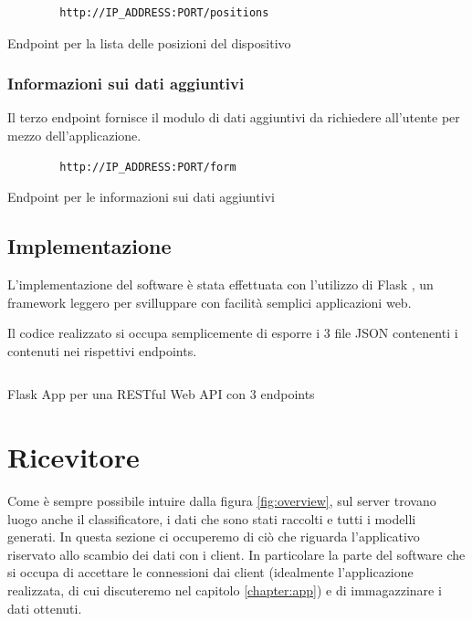 \begin{listing}[H] 
    \begin{verbatim}
        http://IP_ADDRESS:PORT/positions
    \end{verbatim}
    \caption{Endpoint per la lista delle posizioni del dispositivo}
    \label{listing:endpoint-positions}
\end{listing}

\subsubsection{Informazioni sui dati aggiuntivi}
Il terzo endpoint fornisce il modulo di dati aggiuntivi da richiedere all'utente per mezzo dell'applicazione.

\begin{listing}[H] 
    \begin{verbatim}
        http://IP_ADDRESS:PORT/form
    \end{verbatim}
    \caption{Endpoint per le informazioni sui dati aggiuntivi}
    \label{listing:endpoint-form}
\end{listing}

\subsection{Implementazione}
L'implementazione del software è stata effettuata con l'utilizzo di Flask \cite{flask}, un framework leggero 
per svilluppare con facilità semplici applicazioni web.

Il codice realizzato si occupa semplicemente di esporre i 3 file JSON contenenti i contenuti nei rispettivi endpoints.

\begin{listing}[H] 
    \inputminted[frame=single,framesep=10pt]{python}{assets/snippets/server/api/flask.py}
    \caption{Flask App per una RESTful Web API con 3 endpoints}
\end{listing}



\section{Ricevitore}
\label{section:receiver}
Come è sempre possibile intuire dalla figura \ref{fig:overview}, sul server trovano luogo anche il classificatore, 
i dati che sono stati raccolti e tutti i modelli generati. 
In questa sezione ci occuperemo di ciò che riguarda l'applicativo riservato allo scambio dei dati con i client. In particolare
la parte del software che si occupa di accettare le connessioni dai client (idealmente l'applicazione realizzata, di cui 
discuteremo nel capitolo \ref{chapter:app}) e di immagazzinare i dati ottenuti.

